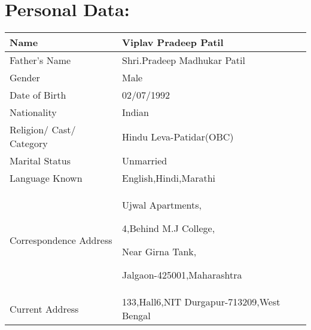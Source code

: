 \documentclass[a4paper,10pt]{article}
\begin{document}
   














\section{Personal Data:}

\begin{tabu} to 1.2\textwidth { | X[l] | X[1] | }
 \hline
\large Name & Viplav Pradeep  Patil \\

\hline
\large Father’s Name   & Shri.Pradeep Madhukar Patil  \\
 
\hline
\large Gender & Male \\
 
\hline
\large Date of Birth   & 02/07/1992 \\
 
\hline
\large Nationality  & Indian \\
 
\hline
\large Religion/ Cast/ Category   & Hindu Leva-Patidar(OBC)   \\
 
\hline
\large Marital Status   & Unmarried   
\\
 
\hline
\large Language Known   & English,Hindi,Marathi 
\\
 
\hline
\large Correspondence Address &  Ujwal Apartments, 
\par 4,Behind M.J College,
\par Near Girna Tank,
\par Jalgaon-425001,Maharashtra \\
%
\hline
\large Current Address & 133,Hall6,NIT Durgapur-713209,West Bengal \\
\hline

\end{tabu}
\end{document}
